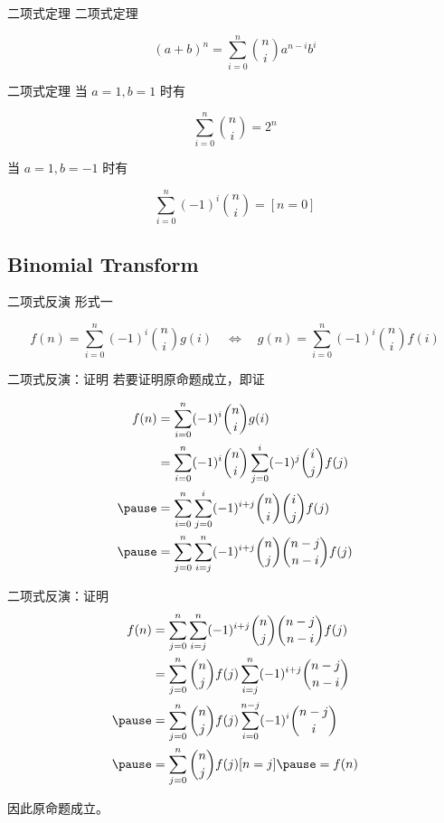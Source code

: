 \documentclass[12pt,aspectratio=169,handout]{beamer}
\begin{document}
\begin{frame}[fragile]{二项式定理}
二项式定理

$$
(a+b)^n = \sum_{i=0}^{n} {n \choose i} a^{n-i} b^{i}
$$
\end{frame}

\begin{frame}[fragile]{二项式定理}
当 $a=1, b=1$ 时有

$$
\sum_{i=0}^{n} {n \choose i} = 2^n
$$

当 $a=1, b=-1$ 时有

$$
\sum_{i=0}^{n} (-1)^i {n \choose i} = [n = 0]
$$
\end{frame}

\subsection[二项式反演]{Binomial Transform}

\begin{frame}[fragile]{二项式反演}
形式一

$$
f(n) = \sum_{i=0}^{n} (-1)^i {n \choose i} g(i)
\quad \Longleftrightarrow \quad
g(n) = \sum_{i=0}^{n} (-1)^i {n \choose i} f(i)
$$
\end{frame}

\begin{frame}[fragile]{二项式反演：证明}
若要证明原命题成立，即证

$$
\begin{aligned}
  f(n) &= \sum_{i=0}^{n} (-1)^i {n \choose i} g(i) \\
       &= \sum_{i=0}^{n} (-1)^i {n \choose i} \sum_{j=0}^{i} (-1)^j {i \choose j} f(j) \\ \pause
       &= \sum_{i=0}^{n} \sum_{j=0}^{i} (-1)^{i+j} {n \choose i} {i \choose j} f(j) \\ \pause
       &= \sum_{j=0}^{n} \sum_{i=j}^{n} (-1)^{i+j} {n \choose j} {n - j \choose n - i} f(j)
\end{aligned}
$$
\end{frame}

\begin{frame}[fragile]{二项式反演：证明}
$$
\begin{aligned}
  f(n) &= \sum_{j=0}^{n} \sum_{i=j}^{n} (-1)^{i+j} {n \choose j} {n - j \choose n - i} f(j) \\
       &= \sum_{j=0}^{n} {n \choose j} f(j) \sum_{i=j}^{n} (-1)^{i+j} {n - j \choose n - i} \\ \pause
       &= \sum_{j=0}^{n} {n \choose j} f(j) \sum_{i=0}^{n-j} (-1)^{i} {n - j \choose i} \\ \pause
       &= \sum_{j=0}^{n} {n \choose j} f(j) [n = j] \pause = f(n)
\end{aligned}
$$

因此原命题成立。
\end{frame}
\end{document}
